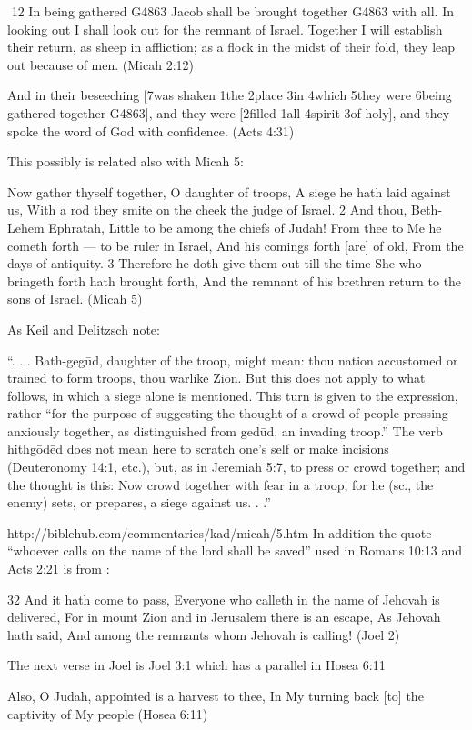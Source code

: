 \documentclass[11pt]{article}
\begin{document}
​
12 In being gathered G4863 Jacob shall be brought together G4863 with all. In looking out I shall look out for the remnant of Israel. Together I will establish their return, as sheep in affliction; as a flock in the midst of their fold, they leap out because of men. (Micah 2:12)

And in their beseeching [7was shaken 1the 2place 3in 4which 5they were 6being gathered together G4863], and they were [2filled 1all 4spirit 3of holy], and they spoke the word of God with confidence. (Acts 4:31)

This possibly is related also with Micah 5:


Now gather thyself together, O daughter of troops, A siege he hath laid against us, With a rod they smite on the cheek the judge of Israel.
2 And thou, Beth-Lehem Ephratah, Little to be among the chiefs of Judah! From thee to Me he cometh forth — to be ruler in Israel, And his comings forth [are] of old, From the days of antiquity.
3 Therefore he doth give them out till the time She who bringeth forth hath brought forth, And the remnant of his brethren return to the sons of Israel. (Micah 5)

As Keil and Delitzsch note:

“. . . Bath-gegūd, daughter of the troop, might mean: thou nation accustomed or trained to form troops, thou warlike Zion. But this does not apply to what follows, in which a siege alone is mentioned. This turn is given to the expression, rather “for the purpose of suggesting the thought of a crowd of people pressing anxiously together, as distinguished from gedūd, an invading troop.” The verb hithgōdēd does not mean here to scratch one’s self or make incisions (Deuteronomy 14:1, etc.), but, as in Jeremiah 5:7, to press or crowd together; and the thought is this: Now crowd together with fear in a troop, for he (sc., the enemy) sets, or prepares, a siege against us. . .”

http://biblehub.com/commentaries/kad/micah/5.htm
In addition the quote “whoever calls on the name of the lord shall be saved” used in Romans 10:13 and Acts 2:21 is from :


32 And it hath come to pass, Everyone who calleth in the name of Jehovah is delivered, For in mount Zion and in Jerusalem there is an escape, As Jehovah hath said, And among the remnants whom Jehovah is calling! (Joel 2)

The next verse in Joel is Joel 3:1 which has a parallel in Hosea 6:11

Also, O Judah, appointed is a harvest to thee, In My turning back [to] the captivity of My people (Hosea 6:11)
\end{document}
